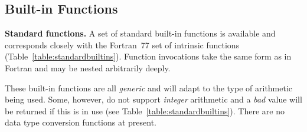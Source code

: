 \documentclass[twoside,nolof,11pt]{starlink}
\begin{document}
\subsection{Built-in Functions}

\textbf{Standard functions.}
A set of standard built-in functions is available and corresponds closely
with the Fortran~77 set of intrinsic functions
(Table~\ref{table:standardbuiltins}).
Function invocations take the same form as in Fortran and may be nested
arbitrarily deeply.

These built-in functions are all \emph{generic} and will adapt to the type of
arithmetic being used.
Some, however, do not support \emph{integer} arithmetic and a \emph{bad} value
will be returned if this is in use (see Table~\ref{table:standardbuiltins}).
There are no data type conversion functions at present.
\end{document}
